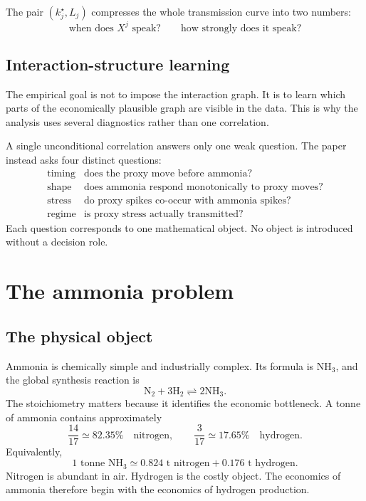 \documentclass[11pt]{article}
\newcommand{\NH}{\mathrm{NH_3}}
\newcommand{\Ntwo}{\mathrm{N_2}}
\newcommand{\Htwo}{\mathrm{H_2}}
\newcommand{\1}{\mathbf 1}
\begin{document}
The pair \((k_j^\star,L_j)\) compresses the whole transmission curve into two numbers:
\[
\text{when does }X^j\text{ speak?}
\qquad
\text{how strongly does it speak?}
\]

\subsection{Interaction-structure learning}

The empirical goal is not to impose the interaction graph. It is to learn which parts of the economically plausible graph are visible in the data. This is why the analysis uses several diagnostics rather than one correlation.

A single unconditional correlation answers only one weak question. The paper instead asks four distinct questions:
\[
\begin{array}{ll}
\text{timing} & \text{does the proxy move before ammonia?}\\
\text{shape} & \text{does ammonia respond monotonically to proxy moves?}\\
\text{stress} & \text{do proxy spikes co-occur with ammonia spikes?}\\
\text{regime} & \text{is proxy stress actually transmitted?}
\end{array}
\]
Each question corresponds to one mathematical object. No object is introduced without a decision role.

\section{The ammonia problem}

\subsection{The physical object}

Ammonia is chemically simple and industrially complex. Its formula is \(\NH\), and the global synthesis reaction is
\[
\Ntwo + 3\Htwo
\rightleftharpoons
2\NH .
\]
The stoichiometry matters because it identifies the economic bottleneck. A tonne of ammonia contains approximately
\[
\frac{14}{17}\simeq 82.35\%
\quad\text{nitrogen},
\qquad
\frac{3}{17}\simeq 17.65\%
\quad\text{hydrogen}.
\]
Equivalently,
\[
1\text{ tonne }\NH
\simeq
0.824\text{ t nitrogen}
+
0.176\text{ t hydrogen}.
\]
Nitrogen is abundant in air. Hydrogen is the costly object. The economics of ammonia therefore begin with the economics of hydrogen production.
\end{document}
